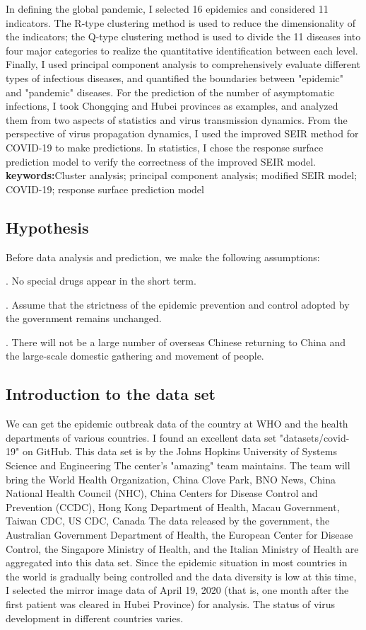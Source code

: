 \documentclass[a4paper, 11pt,twoside=true]{scrartcl}
\begin{document}
\quad In defining the global pandemic, I selected 16 epidemics and considered 11 indicators. The R-type clustering method is used to reduce the dimensionality of the indicators; the Q-type clustering method is used to divide the 11 diseases into four major categories to realize the quantitative identification between each level. Finally, I used principal component analysis to comprehensively evaluate different types of infectious diseases, and quantified the boundaries between "epidemic" and "pandemic" diseases. For the prediction of the number of asymptomatic infections, I took Chongqing and Hubei provinces as examples, and analyzed them from two aspects of statistics and virus transmission dynamics. From the perspective of virus propagation dynamics, I used the improved SEIR method for COVID-19 to make predictions. In statistics, I chose the response surface prediction model to verify the correctness of the improved SEIR model.\\
\textbf{keywords:}Cluster analysis; principal component analysis; modified SEIR model; COVID-19; response surface prediction model
\newpage
\restoregeometry

\subsection{Hypothesis}
Before data analysis and prediction, we make the following assumptions:

. No special drugs appear in the short term.

. Assume that the strictness of the epidemic prevention and control adopted by the government remains unchanged.

. There will not be a large number of overseas Chinese returning to China and the large-scale domestic gathering and movement of people.\\

\subsection{Introduction to the data set}
\qquad We can get the epidemic outbreak data of the country at WHO and the health departments of various countries. I found an excellent data set "datasets/covid-19" on GitHub. This data set is by the Johns Hopkins University of Systems Science and Engineering The center's "amazing" team maintains. The team will bring the World Health Organization, China Clove Park, BNO News, China National Health Council (NHC), China Centers for Disease Control and Prevention (CCDC), Hong Kong Department of Health, Macau Government, Taiwan CDC, US CDC, Canada The data released by the government, the Australian Government Department of Health, the European Center for Disease Control, the Singapore Ministry of Health, and the Italian Ministry of Health are aggregated into this data set. Since the epidemic situation in most countries in the world is gradually being controlled and the data diversity is low at this time, I selected the mirror image data of April 19, 2020 (that is, one month after the first patient was cleared in Hubei Province) for analysis. The status of virus development in different countries varies.
\end{document}
